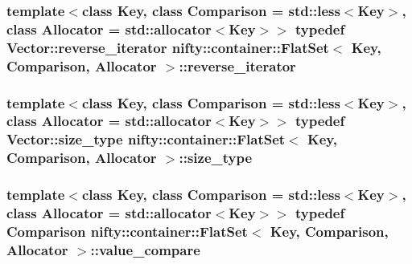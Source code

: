 \subsubsection[{reverse\+\_\+iterator}]{\setlength{\rightskip}{0pt plus 5cm}template$<$class Key, class Comparison = std\+::less$<$\+Key$>$, class Allocator = std\+::allocator$<$\+Key$>$$>$ typedef Vector\+::reverse\+\_\+iterator {\bf nifty\+::container\+::\+Flat\+Set}$<$ Key, Comparison, Allocator $>$\+::{\bf reverse\+\_\+iterator}}\label{classnifty_1_1container_1_1FlatSet_a5ad537835e3b8911ac1beed1a95d3ac2}
\hypertarget{classnifty_1_1container_1_1FlatSet_a06ddeba4c1be37279497ed698dfeb812}{}
\subsubsection[{size\+\_\+type}]{\setlength{\rightskip}{0pt plus 5cm}template$<$class Key, class Comparison = std\+::less$<$\+Key$>$, class Allocator = std\+::allocator$<$\+Key$>$$>$ typedef Vector\+::size\+\_\+type {\bf nifty\+::container\+::\+Flat\+Set}$<$ Key, Comparison, Allocator $>$\+::{\bf size\+\_\+type}}\label{classnifty_1_1container_1_1FlatSet_a06ddeba4c1be37279497ed698dfeb812}
\hypertarget{classnifty_1_1container_1_1FlatSet_a4ec0fabbb2d2f25b985c12581c576384}{}
\subsubsection[{value\+\_\+compare}]{\setlength{\rightskip}{0pt plus 5cm}template$<$class Key, class Comparison = std\+::less$<$\+Key$>$, class Allocator = std\+::allocator$<$\+Key$>$$>$ typedef Comparison {\bf nifty\+::container\+::\+Flat\+Set}$<$ Key, Comparison, Allocator $>$\+::{\bf value\+\_\+compare}}\label{classnifty_1_1container_1_1FlatSet_a4ec0fabbb2d2f25b985c12581c576384}
\hypertarget{classnifty_1_1container_1_1FlatSet_a2366c665ec49d585ff8a77362468d82d}{}

